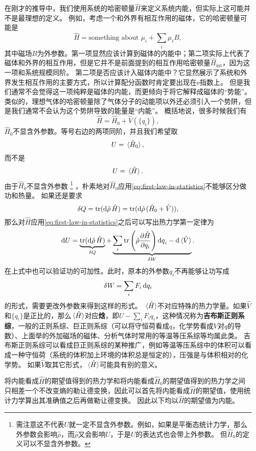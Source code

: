 \documentclass[hyperref, UTF8, a4paper]{ctexart}
\newcommand*{\ee}{\mathrm{e}}
\begin{document}
在刚才的推导中，我们使用系统的哈密顿量$\hat{H}$来定义系统内能，但实际上这可能并不是最理想的定义。
例如，考虑一个和外界有相互作用的磁体，它的哈密顿量可能是
\[
    \hat{H} = \text{something about $\mu_i$} + \sum_i \mu_i B,
\]
其中磁场$B$为外参数。第一项显然应该计算到磁体的内能中；第二项实际上代表了磁体和外界的相互作用，但是它并不是前面提到的相互作用哈密顿量$\hat{H}_\text{int}$，因为这一项和系统规模同阶。
第二项是否应该计入磁体内能中？它显然展示了系统和外界发生相互作用的主要方式，所以计算配分函数时肯定要出现在$\ee$指数上。
但是我们通常不会觉得这一项纯粹是磁体的内能，而更倾向于将它解释成磁体的“势能”。
类似的，理想气体的哈密顿量除了气体分子的动能项以外还必须引入一个势阱，但是我们通常不会认为这个势阱导致的能量是“内能”。
概括地说，很多时候我们有
\[
    \hat{H} = \hat{H}_\text{0} + \hat{V}(\{q_i\}),
\]
$\hat{H}_0$不显含外参数。等号右边的两项同阶，并且我们希望取
\[
    U = \expval*{\hat{H}_0},
\]
而不是
\[
    U = \expval*{\hat{H}}.
\]
由于$\hat{H}_0$不显含外参数%
\footnote{需注意这不代表$U$就一定不显含外参数。例如，如果是平衡态统计力学，那么外参数会影响$\hat{\rho}$，而$\hat{\rho}$又会影响$U$，于是$U$的表达式也会带上外参数。
但$\hat{H}_0$的定义可以不显含外参数。}%
，朴素地对$\hat{H}_0$应用\eqref{eq:first-law-in-statistics}不能够区分做功和热量。
如果还是要求
\[
    \var{Q} = \trace (\dd{\hat{\rho}} \hat{H}) = \trace (\dd{\hat{\rho}} (\hat{H}_0 + \hat{V})), 
\]
那么对$\hat{H}$应用\eqref{eq:first-law-in-statistics}之后可以写出热力学第一定律为
\begin{equation}
    \dd{U} = \underbrace{\trace (\dd{\hat{\rho}} \hat{H})}_{\var{Q}} + \underbrace{\sum_i \trace \left( \hat{\rho} \pdv{\hat{H}}{q_i} \right) \dd{q}_i - \dd{\expval*{\hat{V}}}}_{\var{W}}.
\end{equation}
在上式中也可以验证功的可加性。此时，原本的外参数$q_i$不再能够让功写成
\[
    \var{W} = \sum_i F_i \dd{q_i}
\]
的形式，需要更改外参数来得到这样的形式。
$\expval*{\hat{H}}$不对应特殊的热力学量。如果$\hat{V}$和$\{q_i\}$是正比的，那么$\expval*{\hat{H}}$对应\textbf{焓}，即$U - \sum_i F_i q_i$，这种情况称为\textbf{吉布斯正则系综}，一般的正则系综、巨正则系综（可以将守恒荷看成$q$，化学势看成$V$对$q$的导数）、上面举的外加磁场的磁体、分析气体时常用的等温等压系综等均属此类。
吉布斯正则系综可以看成巨正则系综的某种推广，例如等温等压系综中的体积可以看成一种守恒荷（系统的体积加上环境的体积总是恒定的），压强是与体积相对的化学势。
如果$\hat{V}$取其它形式，$\expval*{\hat{H}}$可能具有别的意义。

将内能看成$\hat{H}$的期望值得到的热力学和将内能看成$\hat{H}_0$的期望值得到的热力学之间只相差一个不改变熵的勒让德变换，因此可以首先将内能看成$\hat{H}$的期望值，使用统计力学算出其准确值之后再做勒让德变换。
因此以下均以$\hat{H}$的期望值为内能。
\end{document}
